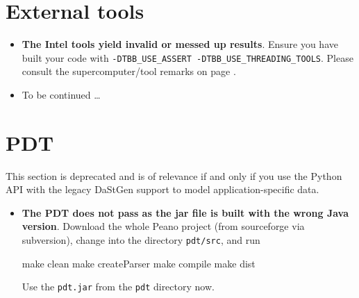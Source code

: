 \section{External tools}
\begin{itemize}
  \item \textbf{The Intel tools yield invalid or messed up results}. Ensure 
    you have built your code with \texttt{-DTBB\_USE\_ASSERT
    -DTBB\_USE\_THREADING\_TOOLS}. Please consult the supercomputer/tool remarks
    on page \pageref{section:supercomputers:IntelTools}.
  \item To be continued \dots
\end{itemize}



\section{PDT}

This section is deprecated and is of relevance if and only if you use the Python API with 
the legacy DaStGen support to model application-specific data.


\begin{itemize}
  \item \textbf{ The PDT does not pass as the jar file is built with the wrong
  Java version}. Download the whole Peano project (from sourceforge via subversion),
  change into the directory \texttt{pdt/src}, and run
  \begin{code}
  make clean
  make createParser
  make compile
  make dist
  \end{code}
  Use the \texttt{pdt.jar} from the \texttt{pdt} directory now. 
\end{itemize}







